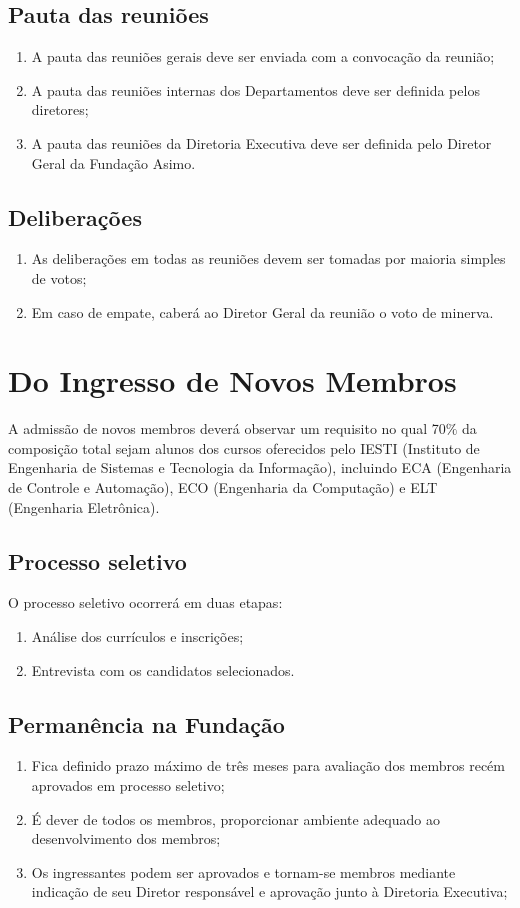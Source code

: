     \subsection{Pauta das reuniões}
    \begin{enumerate}
        \item A pauta das reuniões gerais deve ser enviada com a convocação da reunião;
        \item A pauta das reuniões internas dos Departamentos deve ser definida pelos diretores;
        \item A pauta das reuniões da Diretoria Executiva deve ser definida pelo Diretor Geral da Fundação Asimo.
    \end{enumerate}
    \subsection{Deliberações}
    \begin{enumerate}
        \item As deliberações em todas as reuniões devem ser tomadas por maioria simples de votos;
        \item Em caso de empate, caberá ao Diretor Geral da reunião o voto de minerva.
    \end{enumerate}

\section{Do Ingresso de Novos Membros}
   A admissão de novos membros deverá observar um requisito no qual 70$\%$ da composição total sejam alunos dos cursos oferecidos pelo IESTI (Instituto de Engenharia de Sistemas e Tecnologia da Informação), incluindo ECA (Engenharia de Controle e Automação), ECO (Engenharia da Computação) e ELT (Engenharia Eletrônica).
    \subsection{Processo seletivo}
    O processo seletivo ocorrerá em duas etapas:
    \begin{enumerate}
        \item Análise dos currículos e inscrições;
        \item Entrevista com os candidatos selecionados.
    \end{enumerate}
    \subsection{Permanência na Fundação}
    \begin{enumerate}
        \item Fica definido prazo máximo de três meses para avaliação dos membros recém aprovados em processo seletivo;
        \item É dever de todos os membros, proporcionar ambiente adequado ao desenvolvimento dos membros;
        \item Os ingressantes podem ser aprovados e tornam-se membros mediante indicação de seu Diretor responsável e aprovação junto à Diretoria Executiva;    
    \end{enumerate}


